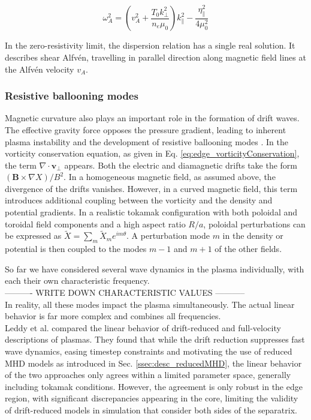 \begin{equation}
	\label{eq:dispersionRelation}
	\omega_A^2 = \left(v_A^2 + \frac{T_0 k_\perp^2}{n_e \mu_0}\right) k_\parallel^2 - \frac{\eta_\parallel^2}{4\mu_0^2}
\end{equation}

In the zero-resistivity limit, the dispersion relation has a single real solution. It describes shear Alfvén, travelling in parallel direction along magnetic field lines at the Alfvén velocity $v_A$.


\subsubsection{Resistive ballooning modes}

Magnetic curvature also plays an important role in the formation of drift waves. The effective gravity force opposes the pressure gradient, leading to inherent plasma instability and the development of resistive ballooning modes \cite{hastie2003drift}. In the vorticity conservation equation, as given in Eq. \ref{eq:edge_vorticityConservation}, the term $ \nabla \cdot \mathbf{v}_\perp $ appears. Both the electric and diamagnetic drifts take the form $ ( \mathbf{B} \times \nabla X)/B^2 $. In a homogeneous magnetic field, as assumed above, the divergence of the drifts vanishes. However, in a curved magnetic field, this term introduces additional coupling between the vorticity and the density and potential gradients. In a realistic tokamak configuration with both poloidal and toroidal field components and a high aspect ratio $ R/a $, poloidal perturbations can be expressed as $ \tilde{X} = \sum_m \tilde{X}_m e^{im\theta} $. A perturbation mode $ m $ in the density or potential is then coupled to the modes $ m-1 $ and $ m+1 $ of the other fields. \newline 


So far we have considered several wave dynamics in the plasma individually, with each their own characteristic frequency.  \\
---------- WRITE DOWN CHARACTERISTIC VALUES -----------  \\
In reality, all these modes impact the plasma simultaneously. The actual linear behavior is far more complex and combines all frequencies. \\

Leddy et al. \cite{leddy2015validity} compared the linear behavior of drift-reduced and full-velocity descriptions of plasmas. They found that while the drift reduction suppresses fast wave dynamics, easing timestep constraints and motivating the use of reduced MHD models as introduced in Sec. \ref{ssec:desc_reducedMHD}, the linear behavior of the two approaches only agrees within a limited parameter space, generally including tokamak conditions. However, the agreement is only robust in the edge region, with significant discrepancies appearing in the core, limiting the validity of drift-reduced models in simulation that consider both sides of the separatrix.



